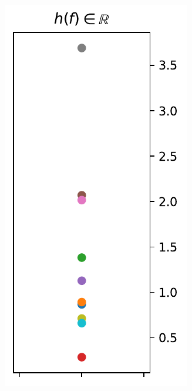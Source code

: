\documentclass{beamer}
\begin{document}
\begin{frame}
\begin{columns}
    \includegraphics[width=.99\textwidth, height=2.5\textwidth]{figures/response.pdf}
  \end{columns}

  \end{frame}
\end{document}
